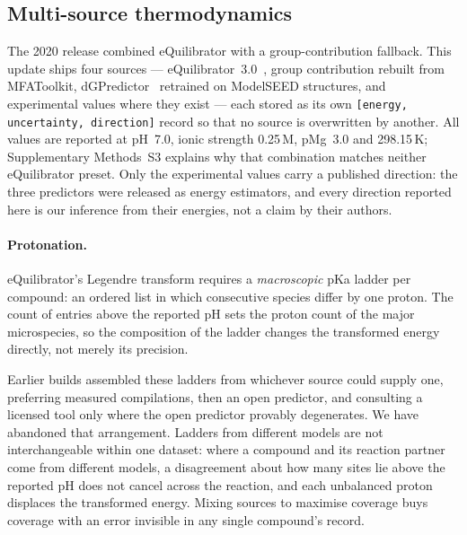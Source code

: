 \subsection{Multi-source thermodynamics}\label{sec:methods-thermo}

The 2020 release combined eQuilibrator with a group-contribution fallback. This
update ships four sources --- eQuilibrator~3.0~\cite{beber2022}, group
contribution rebuilt from MFAToolkit, dGPredictor~\cite{wang2021} retrained on
ModelSEED structures, and experimental values where they exist --- each stored
as its own \texttt{[energy, uncertainty, direction]} record so that no source is
overwritten by another. All values are reported at pH~7.0, ionic strength
0.25\,M, pMg~3.0 and 298.15\,K; Supplementary Methods~S3 explains why that
combination matches neither eQuilibrator preset. Only the experimental values
carry a published direction: the three predictors were released as energy
estimators, and every direction reported here is our inference from their
energies, not a claim by their authors.

\paragraph{Protonation.} eQuilibrator's Legendre transform requires a
\emph{macroscopic} pKa ladder per compound: an ordered list in which
consecutive species differ by one proton. The count of entries above the
reported pH sets the proton count of the major microspecies, so the composition
of the ladder changes the transformed energy directly, not merely its
precision.

Earlier builds assembled these ladders from whichever source could supply one,
preferring measured compilations, then an open predictor, and consulting a
licensed tool only where the open predictor provably degenerates. We have
abandoned that arrangement. Ladders from different models are not
interchangeable within one dataset: where a compound and its reaction partner
come from different models, a disagreement about how many sites lie above the
reported pH does not cancel across the reaction, and each unbalanced proton
displaces the transformed energy. Mixing sources to maximise coverage buys
coverage with an error invisible in any single compound's record.

